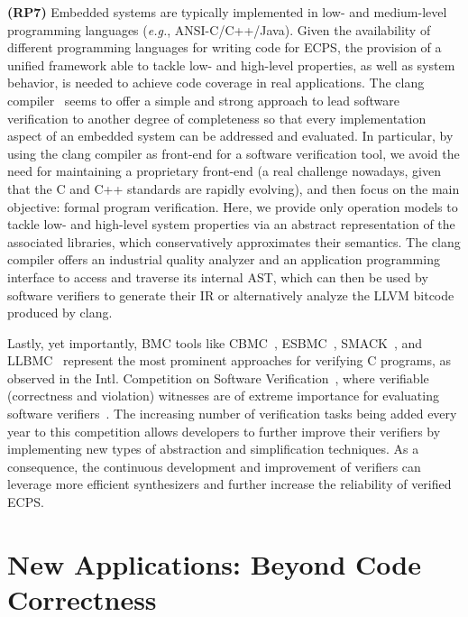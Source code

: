 \documentclass[format=acmsmall, review=false, screen=true]{acmart}
\begin{document}
{{\textbf{(RP7)} Embedded systems are typically implemented in low- and medium-level programming languages ({\it e.g.}, ANSI-C/C++/Java). Given the availability of different programming languages for writing code for ECPS, the provision of a unified framework able to tackle low- and high-level properties, as well as system behavior, is needed to achieve code coverage in real applications. The clang compiler~\cite{Lopes:2014:GSL:2692607} seems to offer a simple and strong approach to lead software verification to another degree of completeness so that every implementation aspect of an embedded system can be addressed and evaluated. In particular, by using the clang compiler as front-end for a software verification tool, we avoid the need for maintaining a proprietary front-end (a real challenge nowadays, given that the C and C++ standards are rapidly evolving), and then focus on the main objective: formal program verification. Here, we provide only operation models to tackle low- and high-level system properties via an abstract representation of the associated libraries, which conservatively approximates their semantics. The clang compiler offers an industrial quality analyzer and an application programming interface to access and traverse its internal AST, which can then be used by software verifiers to generate their IR or alternatively analyze the LLVM bitcode produced by clang. 

Lastly, yet importantly, BMC tools like CBMC~\cite{Clarke04}, ESBMC~\cite{MorseCNF13,MorseRCN014}, SMACK~\cite{Haran15}, and LLBMC~\cite{MerzFS12} represent the most prominent approaches for verifying C programs, as observed in the Intl. Competition on Software Verification~\cite{Beyer14,BeyerSVCOMP15,Beyer16}, where verifiable (correctness and violation) witnesses are of extreme importance for evaluating software verifiers~\cite{BeyerW15,RochaIFM12}. The increasing number of verification tasks being added every year to this competition allows developers to further improve their verifiers by implementing new types of abstraction and simplification techniques. As a consequence, the continuous development and improvement of verifiers can leverage more efficient synthesizers and further increase the reliability of verified ECPS.

\section{New Applications: Beyond Code Correctness}
\label{Newapp}

}}
\end{document}
